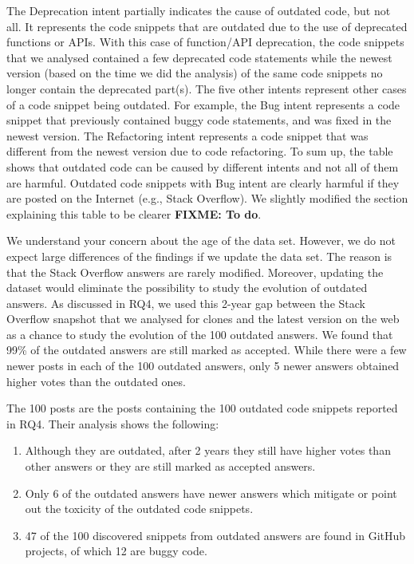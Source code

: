 \documentclass[a4paper,twoside,10pt]{reviewresponse}
\newcommand\FIXME[1]{{\color{red}\textbf{FIXME: #1}}}
\begin{document}
The Deprecation intent partially indicates the cause of outdated code, but not all. It represents the code snippets that are outdated due to the use of deprecated functions or APIs. With this case of function/API deprecation, the code snippets that we analysed contained a few deprecated code statements while the newest version (based on the time we did the analysis) of the same code snippets no longer contain the deprecated part(s). The five other intents represent other cases of a code snippet being outdated. For example, the Bug intent represents a code snippet that previously contained buggy code statements, and was fixed in the newest version. The Refactoring intent represents a code snippet that was different from the newest version due to code refactoring.
To sum up, the table shows that outdated code can be caused by different intents and not all of them are harmful. Outdated code snippets with Bug intent are clearly harmful if they are posted on the Internet (e.g., Stack Overflow). We slightly modified the section explaining this table to be clearer \FIXME{To do}.


We understand your concern about the age of the data set. However, we do not expect large differences of the findings if we update the data set. The reason is that the Stack Overflow answers are rarely modified. Moreover, updating the dataset would eliminate the possibility to study the evolution of outdated answers. As discussed in RQ4, we used this 2-year gap between the Stack Overflow snapshot that we analysed for clones and the latest version on the web as a chance to study the evolution of the 100 outdated answers. We found that 99\% of the outdated answers are still marked as accepted. While there were a few newer posts in each of the 100 outdated answers, only 5 newer answers obtained higher votes than the outdated ones.

The 100 posts are the posts containing the 100 outdated code snippets reported in RQ4. Their analysis shows the following: 
\begin{enumerate}
	\item Although they are outdated, after 2 years they still have higher votes than other answers or they are still marked as accepted answers.
	\item Only 6 of the outdated answers have newer answers which mitigate or point out the toxicity of the outdated code snippets. 
	\item 47 of the 100 discovered snippets from outdated answers are found in GitHub projects, of which 12 are buggy code. 
\end{enumerate}
\end{document}
